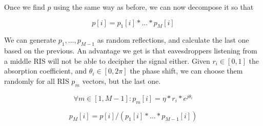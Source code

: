 Once we find $p$ using the same way as before, we can now decompose it so that

\begin{equation}
  p[i] = p_1[i] * ... * p_M[i]
\end{equation}

We can generate $p_1, ..., p_{M-1}$ as random reflections, and calculate the last one based on the previous. An advantage we get is that eavesdroppers listening from a middle RIS will not be able to decipher the signal either. Given $r_i \in [0, 1]$ the absorption coefficient, and $\theta_i \in [0, 2\pi]$ the phase shift, we can choose them randomly for all RIS $p_m$ vectors, but the last one.

\begin{equation}
  \forall m \in [1, M-1] : p_m[i] = \eta * r_i * e^{j\theta_i}
\end{equation}

\begin{equation}
  p_M[i] = p[i] / (p_1[i] * ... * p_{M-1}[i])
\end{equation}
